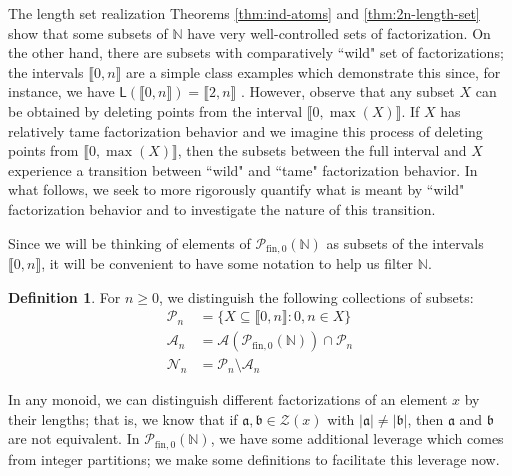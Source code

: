 \documentclass{report}
\renewcommand{\aa}{\mathfrak{a}}
\newcommand{\bb}{\mathfrak{b}}
\newcommand{\NN}{\mathbb{N}}
\renewcommand{\P}{\mathcal{P}}
\newcommand{\Z}{\mathcal{Z}}
\newcommand{\llb}{\llbracket}
\newcommand{\rrb}{\rrbracket}
\newcommand{\fin}{\textrm{fin}}
\renewcommand{\:}{\text{:}}
\newcommand{\PN}{{\P_{\fin,0}(\NN)}}
\theoremstyle{definition}
\newtheorem{defn}{Definition}[section]
\begin{document}
The length set realization Theorems \ref{thm:ind-atoms} and \ref{thm:2n-length-set} show that some subsets of $\NN$ have very well-controlled sets of factorization.
On the other hand, there are subsets with comparatively ``wild" set of factorizations; the intervals $\llb 0,n \rrb$ are a simple class examples which demonstrate this since, for instance, we have $\mathsf{L}(\llb0,n\rrb) = \llb 2,n \rrb$ \cite[Proposition 4.8]{fan-tringali18}.
However, observe that any subset $X$ can be obtained by deleting points from the interval $\llb 0,\max(X) \rrb$.
If $X$ has relatively tame factorization behavior and we imagine this process of deleting points from $\llb 0,\max(X)\rrb$, then the subsets between the full interval and $X$ experience a transition between ``wild" and ``tame" factorization behavior.
In what follows, we seek to more rigorously quantify what is meant by ``wild" factorization behavior and to investigate the nature of this transition.

Since we will be thinking of elements of $\PN$ as subsets of the intervals $\llb 0,n \rrb$, it will be convenient to have some notation to help us filter $\NN$.


\begin{defn} \label{def:filtration}
	For $n\ge 0$, we distinguish the following collections of subsets:
	\begin{align*}
	\P_n &= \{ X \subseteq \llb 0,n \rrb : 0,n\in X \} \\
	\mathcal{A}_n &= \mathcal{A}(\PN) \cap \P_n  \\
	\mathcal{N}_n &= \P_n \setminus \mathcal{A}_n 
	\end{align*}
\end{defn}



In any monoid, we can distinguish different factorizations of an element $x$ by their lengths; that is, we know that if $\aa,\bb\in \Z(x)$ with $|\aa| \neq |\bb|$, then $\aa$ and $\bb$ are not equivalent.
In $\PN$, we have some additional leverage which comes from integer partitions; we make some definitions to facilitate this leverage now.
\end{document}
